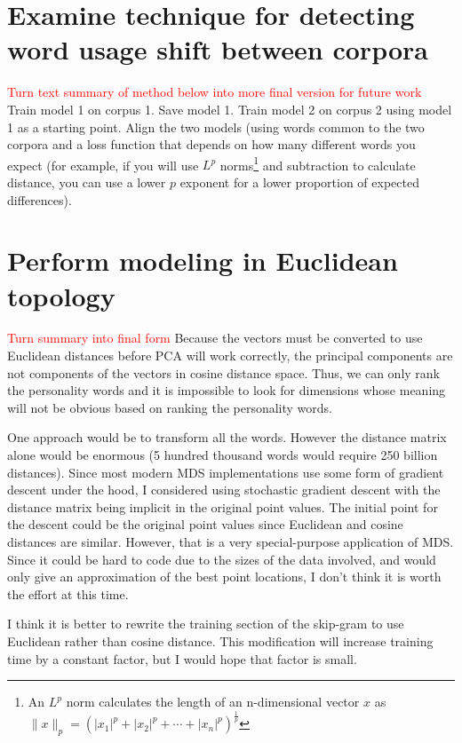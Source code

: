 \documentclass[10pt,letterpaper]{book}
\newcommand{\todo}[1]{\textcolor{red}{#1}}
\begin{document}
\section{Examine technique for detecting word usage shift between corpora}

\todo{Turn text summary of method below into more final version for future work}
Train model 1 on corpus 1. Save model 1. Train model 2 on corpus 2 using model 1 as a starting point. Align the two models (using words common to the two corpora and a loss function that depends on how many different words you expect (for example, if you will use $L^p$ norms\footnote{An $L^p$ norm calculates the length of an n-dimensional vector $x$ as $\|x\|_p=\left(|x_1|^p+|x_2|^p+\dotsb+|x_n|^p\right)^{\frac{1}{p}}$} and subtraction to calculate distance, you can use a lower $p$ exponent for a lower proportion of expected differences).

\section{Perform modeling in Euclidean topology}

\todo{Turn summary into final form}
Because the vectors must be converted to use Euclidean distances before PCA will work correctly, the principal components are not components of the vectors in cosine distance space. Thus, we can only rank the personality words and it is impossible to look for dimensions whose meaning will not be obvious based on ranking the personality words.

One approach would be to transform all the words. However the distance matrix alone would be enormous (5 hundred thousand words would require 250 billion distances). Since most modern MDS implementations use some form of gradient descent under the hood, I considered using stochastic gradient descent with the distance matrix being implicit in the original point values. The initial point for the descent could be the original point values since Euclidean and cosine distances are similar. However, that is a very special-purpose application of MDS. Since it could be hard to code due to the sizes of the data involved, and would only give an approximation of the best point locations, I don't think it is worth the effort at this time.

I think it is better to rewrite the training section of the skip-gram to use Euclidean rather than cosine distance. This modification will increase training time by a constant factor, but I would hope that factor is small.
\end{document}
